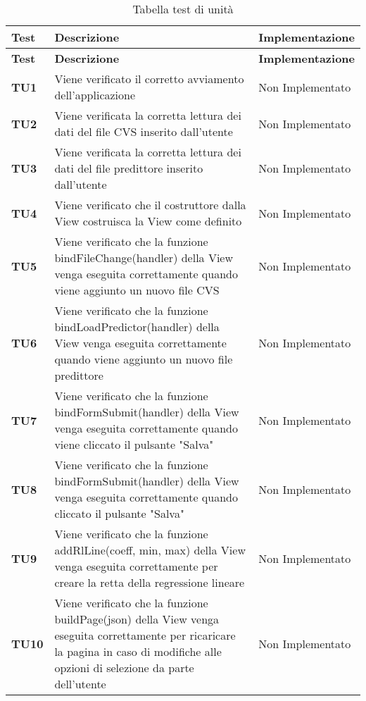 \documentclass[../piano-di-qualifica.tex]{subfiles}
\begin{document}
\renewcommand{\arraystretch}{2} %
\begin{longtable}[H]{>{\centering\bfseries}m{2.5cm} >{\centering}m{7.5cm} >{\centering\arraybackslash}m{3.5cm}}
  \caption{Tabella test di unità}%
  \label{tab:tabella_test_di_unita}                                                    \\
  \rowcolor{lightgray}
  {\textbf{Test}} & {\textbf{Descrizione}} & {\textbf{Implementazione}}  \\
  \endfirsthead%
  \rowcolor{lightgray}
  {\textbf{Test}} & {\textbf{Descrizione}} & {\textbf{Implementazione}}  \\
  \endhead%
  \rowcolor{white}
  \multicolumn{3}{c}{\textit{Continua alla pagina successiva}}
  \endfoot%
  \endlastfoot%
  \textbf{TU1} & Viene verificato il corretto avviamento dell'applicazione & Non Implementato \\
  \textbf{TU2} & Viene verificata la corretta lettura dei dati del file CVS inserito dall'utente & Non Implementato \\
  \textbf{TU3} & Viene verificata la corretta lettura dei dati del file predittore inserito dall'utente & Non Implementato \\
  \textbf{TU4} & Viene verificato che il costruttore dalla View costruisca la View come definito & Non Implementato \\
  \textbf{TU5} & Viene verificato che la funzione bindFileChange(handler) della View venga eseguita correttamente quando viene aggiunto un nuovo file CVS & Non Implementato \\
  \textbf{TU6} & Viene verificato che la funzione bindLoadPredictor(handler) della View venga eseguita correttamente quando viene aggiunto un nuovo file predittore & Non Implementato \\
  \textbf{TU7} & Viene verificato che la funzione bindFormSubmit(handler) della View venga eseguita correttamente quando viene cliccato il pulsante "Salva" & Non Implementato \\
  \textbf{TU8} & Viene verificato che la funzione bindFormSubmit(handler) della View venga eseguita correttamente quando cliccato il pulsante "Salva" & Non Implementato \\
  \textbf{TU9} & Viene verificato che la funzione addRlLine(coeff, min, max) della View venga eseguita correttamente per creare la retta della regressione lineare & Non Implementato \\
  \textbf{TU10} & Viene verificato che la funzione buildPage(json) della View venga eseguita correttamente per ricaricare la pagina in caso di modifiche alle opzioni di selezione da parte dell'utente & Non Implementato \\

\end{longtable}
\end{document}
